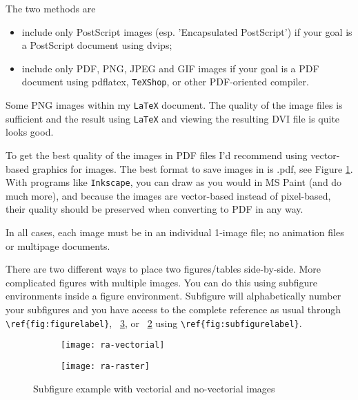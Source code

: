 The two methods are

\begin{itemize}
\item  include only PostScript images (esp. 'Encapsulated PostScript') if your goal is a PostScript document using dvips;
\item include only PDF, PNG, JPEG and GIF images if your goal is a PDF document using pdflatex, \texttt{TeXShop}, or other PDF-oriented compiler. 
\end{itemize}

Some PNG images within my \texttt{LaTeX} document. The quality of the image files is sufficient and the result using \texttt{LaTeX} and viewing the resulting DVI file is quite looks good.

To get the best quality of the images in  PDF files I'd recommend using vector-based graphics for images. The best format to save images in is .pdf, see Figure \ref{fig:ra-vectorial}. With programs like \texttt{Inkscape}, you can draw as you would in MS Paint (and do much more), and because the images are vector-based instead of pixel-based, their quality should be preserved when converting to PDF in any way.    

In all cases, each image must be in an individual 1-image file; no animation files or multipage documents. 

There are two different ways to place two figures/tables side-by-side.  More complicated figures with multiple images. You can do this using subfigure environments inside a figure environment. Subfigure will alphabetically number your subfigures and you have access to the complete reference as usual through \verb!\ref{fig:figurelabel}!, \figurename~\ref{fig:figura-completa}, or \figurename~\ref{fig:ra-raster} using \verb!\ref{fig:subfigurelabel}!.

\begin{figure}[htbp]
	\centering
    \begin{subfigure}[b]{0.4\textwidth}
    	\centering
		\texttt{[image: ra-vectorial]}
		\caption{}
		\label{fig:ra-vectorial}
     \end{subfigure}	
\qquad\qquad
 	\begin{subfigure}[b]{0.4\textwidth}
    	\centering
		\texttt{[image: ra-raster]}
		\caption{}
		\label{fig:ra-raster}
	\end{subfigure}		
  \caption{Subfigure example with vectorial and no-vectorial images}
  \label{fig:figura-completa}
\end{figure}

